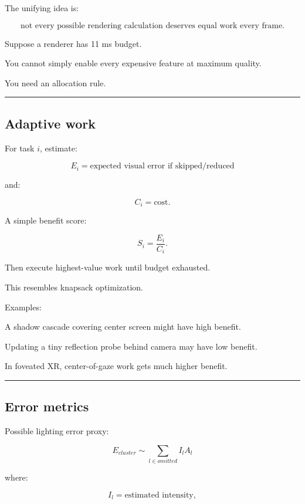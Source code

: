 The unifying idea is:

\[
\boxed{
\text{not every possible rendering calculation deserves equal work every frame}.
}
\]

Suppose a renderer has 11 ms budget.

You cannot simply enable every expensive feature at maximum quality.

You need an allocation rule.

\begin{center}\rule{0.5\linewidth}{0.5pt}\end{center}

\subsection{Adaptive work}\label{04-visual-computing-ii-ch040-adaptive-work}

For task \(i\), estimate:

\[
E_i=
\text{expected visual error if skipped/reduced}
\]

and:

\[
C_i=
\text{cost}.
\]

A simple benefit score:

\[
\boxed{
S_i=
\frac{E_i}{C_i}.
}
\]

Then execute highest-value work until budget exhausted.

This resembles knapsack optimization.

Examples:

A shadow cascade covering center screen might have high benefit.

Updating a tiny reflection probe behind camera may have low benefit.

In foveated XR, center-of-gaze work gets much higher benefit.

\begin{center}\rule{0.5\linewidth}{0.5pt}\end{center}

\subsection{Error metrics}\label{04-visual-computing-ii-ch040-error-metrics}

Possible lighting error proxy:

\[
E_{cluster}
\sim
\sum_{l\in omitted}
I_l
A_l
\]

where:

\[
I_l=\text{estimated intensity},
\]

